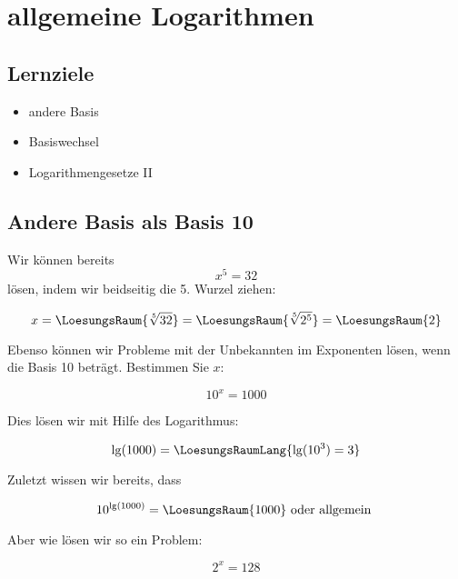 
\section{allgemeine Logarithmen}
\subsection*{Lernziele}

\begin{itemize}
 \item andere Basis
 \item Basiswechsel
 \item Logarithmengesetze II
\end{itemize}


\newpage

\subsection{Andere Basis als Basis 10}

Wir können bereits $$x^5=32$$ lösen, indem wir beidseitig die
5. Wurzel ziehen:

$$x = \LoesungsRaum{\sqrt[5]{32}} = \LoesungsRaum{\sqrt[5]{2^5}} = \LoesungsRaum{2}$$

Ebenso können wir Probleme mit der Unbekannten im Exponenten lösen,
wenn die Basis 10 beträgt. Bestimmen Sie $x$:

$$10^x = 1000$$

Dies lösen wir mit Hilfe des Logarithmus:

$$\lg(1000) = \LoesungsRaumLang{\lg(10^3) = 3}$$

Zuletzt wissen wir bereits, dass

$$10^{\lg(1000)} = \LoesungsRaum{1000} \text{ oder allgemein }$$

\newpage


Aber wie lösen wir so ein Problem:

$$2^x = 128$$

